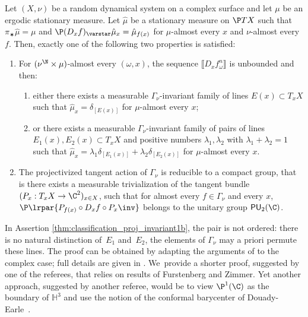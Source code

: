 \begin{thm}\label{thm:classification_proj_invariant}
Let $(X, \nu)$ be a random dynamical system on a complex
surface and let $\mu$ be an ergodic stationary measure. Let
$\hat\mu$ be a stationary measure on $\P TX$ such that $\pi_\varstar {\hat{\mu}}=\mu$ and $\P(D_xf)_\varstar \hat\mu_x = \hat\mu_{f(x)}$
for $\mu$-almost every $x$ and $\nu$-almost every $f$. Then, exactly one of the following two properties is satisfied:
\begin{enumerate}
\item\label{thm:classification_proj_invariant1} For $(\nu^\N\times \mu)$-almost every
$(\omega, x)$, the sequence $\llbracket D_xf^n_\omega\rrbracket$
is unbounded and then:
\begin{enumerate}
\item\label{thm:classification_proj_invariant1a} either there exists a measurable $\Gamma_\nu$-invariant family of lines
$E(x)\subset T_xX$ such that $\hat\mu_x=\delta_{[E(x)]}$ for $\mu$-almost every $x$;
\item\label{thm:classification_proj_invariant1b} or there exists a measurable $\Gamma_\nu$-invariant family of pairs of lines
$E_1(x), E_2(x) \subset T_xX$ and positive numbers $ \lambda_1, \lambda_2$ with
$\lambda_1+\lambda_2 =1$ such that $\hat\mu_x=\lambda_1\delta_{[E_1(x)]} + \lambda_2\delta_{[E_2(x)]}$ for $\mu$-almost every $x$.
\end{enumerate}
\item\label{thm:classification_proj_invariant2} The projectivized tangent action of $\Gamma_\nu$ is reducible to a compact group, that is
there exists a measurable trivialization
of the tangent bundle $(P_x: T_xX \to \C^2)_{x\in X}$, such that for almost
every $f\in \Gamma_\nu$ and every
$x$, $\P\lrpar{P_{f(x)}\circ D_xf\circ P_x\inv}$ belongs to the unitary group $\mathsf{PU}_2(\C)$.
\end{enumerate}
\end{thm}

In Assertion \eqref{thm:classification_proj_invariant1b}, the pair is not ordered: there is no natural distinction of~$E_1$ and~$E_2$,
the elements of $\Gamma_\nu$ may a priori permute these lines.
The proof can be obtained by adapting the arguments of \cite{barrientos-malicet} to the complex case;
full details are given in \cite[\S 7.4]{arxiv-version-of-this-paper}. We~provide a shorter
proof, suggested by
one of the referees, that relies on results of Furstenberg and Zimmer.
Yet another approach, suggested by
another referee, would be to view $\P^1(\C)$ as the boundary of $\mathbb H^3$ and use the notion
of the conformal barycenter of Douady-Earle~\cite{douady-earle}.

